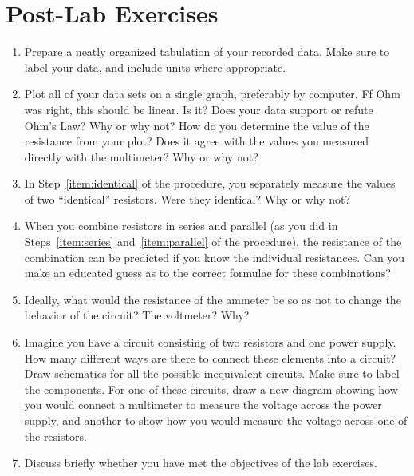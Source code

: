 \documentclass[12pt]{article}
\begin{document}
\newpage

\section*{Post-Lab Exercises}

\begin{enumerate}
\item Prepare a neatly organized tabulation of your recorded data.
  Make sure to label your data, and include units where appropriate.  
\item Plot all of your data sets on a single graph, preferably by
  computer.  Ff Ohm was right, this should be linear.  Is it?  Does
  your data support or refute Ohm's Law?  Why or why not?  How do you
  determine the value of the resistance from your plot?  Does it agree
  with the values you measured directly with the multimeter?  Why or
  why not?
\item In Step~\ref{item:identical} of the procedure, you separately
  measure the values of two ``identical'' resistors.  Were they
  identical?  Why or why not?
\item When you combine resistors in series and parallel (as you did in
  Steps~\ref{item:series} and~\ref{item:parallel} of the procedure),
  the resistance of the combination can be predicted if you know the
  individual resistances.  Can you make an educated guess as to the
  correct formulae for these combinations?
\item Ideally, what would the resistance of the ammeter be so as not
  to change the behavior of the circuit?  The voltmeter?  Why?
\item Imagine you have a circuit consisting of two resistors and one
  power supply.  How many different ways are there to connect these
  elements into a circuit?  Draw schematics for all the possible
  inequivalent circuits.  Make sure to label the components.  For one
  of these circuits, draw a new diagram showing how you would connect
  a multimeter to measure the voltage across the power supply, and
  another to show how you would measure the voltage across one of the
  resistors.
\item Discuss briefly whether you have met the objectives of the lab
  exercises.  
\end{enumerate}
\end{document}
